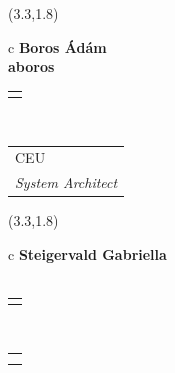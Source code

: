 \documentclass[11pt]{article}
\begin{document}
\makebox(3.3,1.8){
  \renewcommand\arraystretch{1.3}
  \begin{tabular}[c]{c}
    \hspace{8.5mm}
    \LARGE\bf{ Boros Ádám }\\
    \hspace{8.5mm}
    \Large{ aboros }\\
    \renewcommand\arraystretch{3}
    \begin{tabular}[c]{c}
      \centering
      \fontfamily{phv}\selectfont{
        \textbf{
          \textsc{
            \scriptsize{
            \color{Bright}{ Ismerkedő }\color{Bright}{ Webmester }\color{Bright}{ Sminkmester }\color{Bright}{ Programozó }
            }
          }
        }
      }
    \end{tabular}
    \\
    \renewcommand\arraystretch{1}
    \begin{tabular}{p{3.3in}}
      \hspace{.7cm}CEU\\
      \hspace{.7cm}\emph{ System Architect }\\
    \end{tabular}
  \end{tabular}
}

\makebox(3.3,1.8){
  \renewcommand\arraystretch{1.3}
  \begin{tabular}[c]{c}
    \hspace{8.5mm}
    \LARGE\bf{ Steigervald Gabriella }\\
    \hspace{8.5mm}
    \Large{  }\\
    \renewcommand\arraystretch{3}
    \begin{tabular}[c]{c}
      \centering
      \fontfamily{phv}\selectfont{
        \textbf{
          \textsc{
            \scriptsize{
            \color{Bright}{ Ismerkedő }\color{Bright}{ Webmester }\color{Bright}{ Sminkmester }\color{Bright}{ Programozó }
            }
          }
        }
      }
    \end{tabular}
    \\
    \renewcommand\arraystretch{1}
    \begin{tabular}{p{3.3in}}
      \hspace{.7cm}\\
      \hspace{.7cm}\emph{  }\\
    \end{tabular}
  \end{tabular}
}
\end{document}
